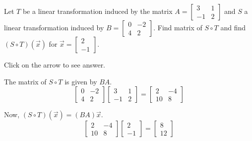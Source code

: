 \documentclass{ximera}
\begin{document}
\begin{problem}\label{prb:6.5} Let $T$ be a linear transformation induced by the matrix $A = \left[ \begin{array}{rr}
3 & 1 \\
-1 & 2
\end{array}\right]$ and $S$ a linear transformation induced by $B = \left[ \begin{array}{rr}
0 & -2 \\
4 & 2
\end{array}\right]$. Find matrix of $S \circ T$ and find $\left( S \circ T \right) \left( \vec{x} \right)$ for $\vec{x} = \left[ \begin{array}{r}
2 \\
-1
\end{array} \right]$.

Click on the arrow to see answer.
\begin{expandable}
The matrix of $S \circ T$ is given by $BA$.
\[
\left[ \begin{array}{rr}
0 & -2 \\
4 & 2
\end{array}\right] \left[ \begin{array}{rr}
3 & 1 \\
-1 & 2
\end{array}\right] = \left[
\begin{array}{rr}
2 & -4 \\
10 & 8
\end{array}
\right]
\]

Now, $\left( S \circ T \right) \left( \vec{x} \right) = (BA) \vec{x}$.
\[
 \left[
\begin{array}{rr}
2 & -4 \\
10 & 8
\end{array}
\right]
\left[ \begin{array}{r}
2 \\
-1
\end{array} \right]
=
\left[
\begin{array}{r}
8 \\
12
\end{array}
\right]
\]

\end{expandable}
\end{problem}
\end{document}
